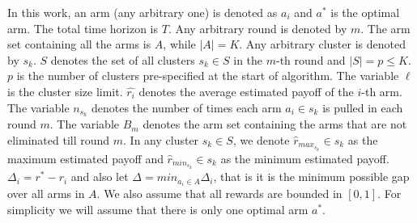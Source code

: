 In this work, an arm (any arbitrary one) is denoted as $a_{i}$ and $a^{*}$ is the optimal arm. The total time horizon is $T$. Any arbitrary round is denoted by $m$. The arm set containing all the arms is $A$, while $|A|=K$. Any arbitrary cluster is denoted by $s_{k}$. $S$ denotes the set of all clusters $s_{k}\in S$ in the $m$-th round and $|S|=p\leq K$. $p$ is the number of clusters pre-specified at the start of algorithm. The variable $\ell$ is the cluster size limit.
$\hat{r_i}$ denotes the average estimated payoff of the $i$-th arm. The variable $n_{s_{k}}$ denotes the number of times each arm $a_{i}\in s_{k}$ is pulled in each round $m$. The variable $B_{m}$ denotes the arm set containing the arms that are not eliminated till round $m$.
	In any cluster $s_{k}\in S$, we denote $\hat{r}_{max_{s_{k}}}\in s_{k}$ as the maximum estimated payoff and $\hat{r}_{min_{s_{k}}}\in s_{k}$ as the minimum estimated payoff. $\Delta_{i}=r^{*}-r_{i}$ and also let $\Delta=min_{a_{i}\in A}\Delta_{i}$, that is it is the minimum possible gap over all arms in $A$.%
We also assume that all rewards are bounded in $[0,1]$. For simplicity we will assume that there is only one optimal arm $a^{*}$.
